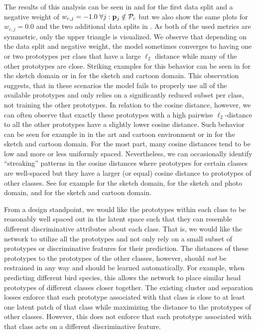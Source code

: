 The results of this analysis can be seen in  and  for the first data split and a negative weight of $w_{c,j} = -1.0\; \forall j: \mathbf{p}_{j} \notin \mathcal{P}_c$ but we also show the same plots for $w_{c,j} = 0.0$ and the two additional data splits in . As both of the used metrics are symmetric, only the upper triangle is visualized. We observe that depending on the data split and negative weight, the model sometimes converges to having one or two prototypes per class that have a large $\ell_2$ distance while many of the other prototypes are close. Striking examples for this behavior can be seen in  for the sketch domain or in  for the sketch and cartoon domain. This observation suggests, that in these scenarios the model fails to properly use all of the available prototypes and only relies on a significantly reduced subset per class, not training the other prototypes. In relation to the cosine distance, however, we can often observe that exactly these prototypes with a high pairwise $\ell_2$-distance to all the other prototypes have a slightly lower cosine distance. Such behavior can be seen for example in  in the art and cartoon environment or in  for the sketch and cartoon domain. For the most part, many cosine distances tend to be low and more or less uniformly spaced. Nevertheless, we can occasionally identify ``streaking'' patterns in the cosine distances where prototypes for certain classes are well-spaced but they have a larger (or equal) cosine distance to prototypes of other classes. See for example  for the sketch domain,  for the sketch and photo domain, and   for the sketch and cartoon domain.

From a design standpoint, we would like the prototypes within each class to be reasonably well spaced out in the latent space such that they can resemble different discriminative attributes about each class. That is, we would like the network to utilize all the prototypes and not only rely on a small subset of prototypes or discriminative features for their prediction. The distances of these prototypes to the prototypes of the other classes, however, should \emph{not} be restrained in any way and should be learned automatically. For example, when predicting different bird species, this allows the network to place similar head prototypes of different classes closer together. The existing cluster and separation losses enforce that each prototype associated with that class is close to at least one latent patch of that class while maximizing the distance to the prototypes of other classes. However, this does not enforce that each prototype associated with that class acts on a different discriminative feature.

